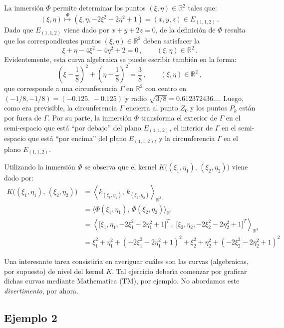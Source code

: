 \documentclass[12pt,reqno]{amsart}
\begin{document}
\smallskip\noindent
La inmersi\'on $\Phi$ permite determinar los puntos
$(\xi,\eta)\in\mathbb{R}^2$ tales que:
$$
(\xi,\eta) \overset{\Phi}{\longmapsto} 
(\xi,\eta,-2\xi^2-2\eta^2+1) = (x,y,z)\in E_{(1,1,2)}\,.
$$
Dado que $E_{(1,1,2)}$ viene dado por $x+y+2z=0$, de la definici\'on de
$\Phi$ resulta que los correspondientes puntos $(\xi,\eta)\in\mathbb{R}^2$
deben satisfacer la 
$$
\xi + \eta - 4\xi^2 - 4\eta^2 + 2 = 0\,,\qquad
(\xi,\eta)\in\mathbb{R}^2\,.
$$
Evidentemente, esta curva algebraica se puede escribir tambi\'en en la
forma:
$$
\left( \xi-\frac18 \right)^2 + \left( \eta-\frac18 \right)^2
= \frac38\,,\qquad (\xi,\eta)\in\mathbb{R}^2\,,
$$
que corresponde a una circunferencia $\Gamma$ en $\mathbb{R}^2$
con centro en $(-1/8,-1/8)=(-0.125,\,-0.125)$ y radio 
$\sqrt{3/8}=0.612372436\dots$.
Luego, como era previsible, la circunferencia $\Gamma$ encierra
al punto $Z_0$ y los puntos $P_k$ est\'an por fuera de $\Gamma$.
Por su parte, la inmersi\'on $\Phi$ transforma
el exterior de $\Gamma$ en el semi-espacio que est\'a
``por debajo'' del plano $E_{(1,1,2)}$, 
el interior de $\Gamma$ en el semi-espacio que est\'a
``por encima'' del plano $E_{(1,1,2)}$, y
la circunferencia $\Gamma$ en el plano $E_{(1,1,2)}$.

\smallskip\noindent
Utilizando la inmersi\'on $\Phi$ se observa que el kernel
$K\big( (\xi_1,\eta_1),\,(\xi_2,\eta_2) \big)$ viene dado por:
\begin{align*}
K\big( (\xi_1,\eta_1),\,(\xi_2,\eta_2) \big)
&= \left\langle k_{(\xi_1,\eta_1)},\,k_{(\xi_2,\eta_2)}
   \right\rangle_{\mathbb{R}^3} \\
&= \big\langle \Phi(\xi_1,\eta_1),\,\Phi(\xi_2,\eta_2)
   \big\rangle_{\mathbb{R}^3} \\
&= \left\langle \big[\xi_1,\eta_1,-2\xi_1^2-2\eta_1^2+1\big]^T\,,\;
   \big[\xi_2,\eta_2,-2\xi_2^2-2\eta_2^2+1\big]^T
   \right\rangle_{\mathbb{R}^3} \\
&= \xi_1^2 + \eta_1^2 + \left(-2\xi_1^2-2\eta_1^2+1\right)^2 +
   \xi_2^2 + \eta_2^2 + \left(-2\xi_2^2-2\eta_2^2+1\right)^2
\end{align*} 





Una interesante tarea consistir\'\i a en averiguar cu\'ales son
las curvas (algebraicas, por supuesto) de nivel del kernel $K$.
Tal ejercicio deber\'\i a comenzar por graficar dichas curvas
mediante Mathematica (TM), por ejemplo.
No abordamos este {\em divertimento\/}, por ahora.

\subsection{Ejemplo 2}
\end{document}
